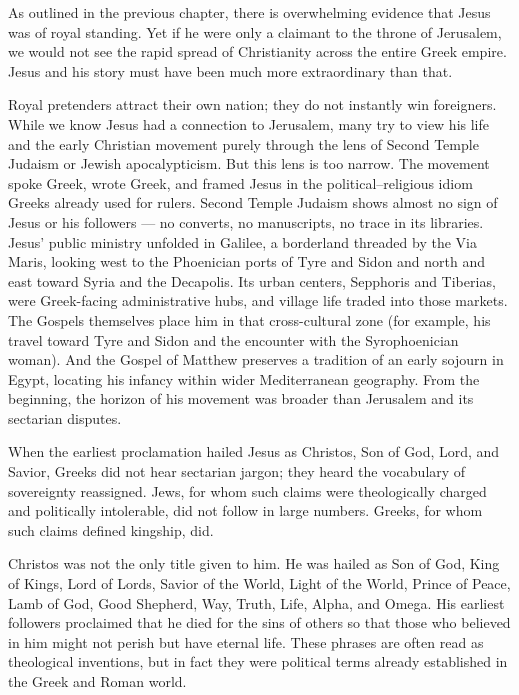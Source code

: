 As outlined in the previous chapter, there is overwhelming evidence that Jesus was of royal standing.
Yet if he were only a claimant to the throne of Jerusalem, we would not see the rapid spread of Christianity across the entire Greek empire.
Jesus and his story must have been much more extraordinary than that.

Royal pretenders attract their own nation; they do not instantly win foreigners.
While we know Jesus had a connection to Jerusalem, many try to view his life and the early Christian movement purely through the lens of Second Temple Judaism or Jewish apocalypticism.
But this lens is too narrow.
The movement spoke Greek, wrote Greek, and framed Jesus in the political–religious idiom Greeks already used for rulers.
Second Temple Judaism shows almost no sign of Jesus or his followers — no converts, no manuscripts, no trace in its libraries.
Jesus’ public ministry unfolded in Galilee, a borderland threaded by the Via Maris, looking west to the Phoenician ports of Tyre and Sidon and north and east toward Syria and the Decapolis.
Its urban centers, Sepphoris and Tiberias, were Greek-facing administrative hubs, and village life traded into those markets.
The Gospels themselves place him in that cross-cultural zone (for example, his travel toward Tyre and Sidon and the encounter with the Syrophoenician woman).
And the Gospel of Matthew preserves a tradition of an early sojourn in Egypt, locating his infancy within wider Mediterranean geography.
From the beginning, the horizon of his movement was broader than Jerusalem and its sectarian disputes.

When the earliest proclamation hailed Jesus as Christos, Son of God, Lord, and Savior, Greeks did not hear sectarian jargon; they heard the vocabulary of sovereignty reassigned.
Jews, for whom such claims were theologically charged and politically intolerable, did not follow in large numbers.
Greeks, for whom such claims defined kingship, did.

Christos was not the only title given to him.
He was hailed as Son of God, King of Kings, Lord of Lords, Savior of the World, Light of the World, Prince of Peace, Lamb of God, Good Shepherd, Way, Truth, Life, Alpha, and Omega.
His earliest followers proclaimed that he died for the sins of others so that those who believed in him might not perish but have eternal life.
These phrases are often read as theological inventions, but in fact they were political terms already established in the Greek and Roman world.

